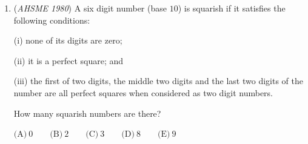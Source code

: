 \begin{enumerate}
	\item (\textit{AHSME 1980}) A six digit number (base $10$) is squarish if it satisfies the following conditions: 


 (i) none of its digits are zero; 


 (ii) it is a perfect square; and 


 (iii) the first of two digits, the middle two digits and the last two digits of the number are all perfect squares when considered as two digit numbers. 


 How many squarish numbers are there? 


 $\text{(A)} \ 0 \qquad  \text{(B)} \ 2 \qquad  \text{(C)} \ 3 \qquad  \text{(D)} \ 8 \qquad  \text{(E)} \ 9$


\end{enumerate}